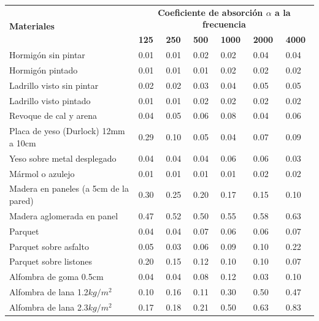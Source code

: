 
\begin{center}
\footnotesize
    \begin{longtable}[!htb]{| m{22em} | m{2.5em} | m{2.5em} | m{2.5em} | m{2.5em} | m{2.5em} |m{2.5em} |}
    \hline
    \multirow{2}{*}{\textbf{Materiales}} & \multicolumn{6}{c|}{\textbf{Coeficiente de absorción $\alpha$ a la frecuencia}}\\
    \cline{2-7}
    & \textbf{125} & \textbf{250} & \textbf{500} & \textbf{1000} & \textbf{2000} & \textbf{4000} \\
    \hline
    Hormig\'on sin pintar & 0.01 & 0.01 & 0.02 & 0.02 & 0.04 & 0.04\\
    \hline
    Hormig\'on pintado & 0.01 & 0.01 & 0.01 & 0.02 & 0.02 & 0.02\\
    \hline
    Ladrillo visto sin pintar & 0.02 & 0.02 & 0.03 & 0.04 & 0.05 & 0.05\\
    \hline
    Ladrillo visto pintado & 0.01 & 0.01 & 0.02 & 0.02 & 0.02 & 0.02\\
    \hline
    Revoque de cal y arena & 0.04 & 0.05 & 0.06 & 0.08 & 0.04 & 0.06\\
    \hline
    Placa de yeso (Durlock) 12mm a 10cm & 0.29 & 0.10 & 0.05 & 0.04 & 0.07 & 0.09\\
    \hline
    Yeso sobre metal desplegado & 0.04 & 0.04 & 0.04 & 0.06 & 0.06 & 0.03\\
    \hline
    M\'armol o azulejo & 0.01 & 0.01 & 0.01 & 0.01 & 0.02 & 0.02\\
    \hline
    Madera en paneles (a 5cm de la pared) & 0.30 & 0.25 & 0.20 & 0.17 & 0.15 & 0.10\\
    \hline
    Madera aglomerada en panel & 0.47 & 0.52 & 0.50 & 0.55 & 0.58 & 0.63\\
    \hline
    Parquet & 0.04 & 0.04 & 0.07 & 0.06 & 0.06 & 0.07\\
    \hline
    Parquet sobre asfalto & 0.05 & 0.03 & 0.06 & 0.09 & 0.10 & 0.22\\
    \hline
    Parquet sobre listones & 0.20 & 0.15 & 0.12 & 0.10 & 0.10 & 0.07\\
    \hline
    Alfombra de goma 0.5cm & 0.04 & 0.04 & 0.08 & 0.12 & 0.03 & 0.10\\
    \hline
    Alfombra de lana 1.2$kg/m^2$ & 0.10 & 0.16 & 0.11 & 0.30 & 0.50 & 0.47\\
    \hline
    Alfombra de lana 2.3$kg/m^2$ & 0.17 & 0.18 & 0.21 & 0.50 & 0.63 & 0.83\\

\end{longtable}
\end{center}
